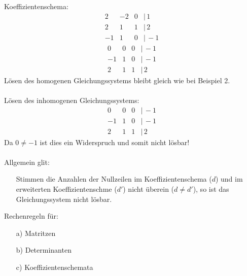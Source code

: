\documentclass{article}
\begin{document}
Koeffizientenschema:
\begin{equation*}
    \begin{matrix}
        2&-2&0&|\,1\\
        2&1&1&|\,2\\
        -1&1&0&|\,-1
    \end{matrix}
\end{equation*}
\begin{equation*}
    \begin{matrix}
        0&0&0&|\,-1\\
        -1&1&0&|\,-1\\
        2&1&1&|\,2
    \end{matrix}
\end{equation*}
Lösen des homogenen Gleichungssystems bleibt gleich wie bei Beispiel 2.\\\\
Lösen des inhomogenen Gleichungssystems:
\begin{equation*}
    \begin{matrix}
        0&0&0&|\,-1\\
        -1&1&0&|\,-1\\
        2&1&1&|\,2
    \end{matrix}
\end{equation*}
Da $0 \neq -1$ ist dies ein Widerspruch und somit nicht lösbar!\\\\
Allgemein glit:
\begin{itemize}
    \item[] Stimmen die Anzahlen der Nullzeilen im Koeffizientenschema ($d$) und im erweiterten Koeffizientenschme ($d'$) nicht überein ($d\neq d'$), so ist das Gleichungssystem nicht lösbar.
\end{itemize}
Rechenregeln für:
\begin{itemize}
    \item[a)] Matritzen
    \item[b)] Determinanten
    \item[c)] Koeffizientenschemata
\end{itemize}
\end{document}

